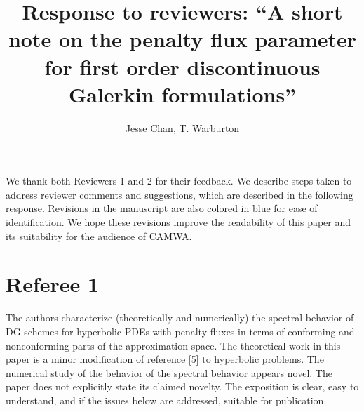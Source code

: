 \documentclass[10pt]{article}
\date{}
\author{Jesse Chan, T. Warburton}
\title{Response to reviewers: ``A short note on the penalty flux parameter for first order discontinuous Galerkin formulations''}
\newcommand{\note}[1]{{\color{blue}#1}}
\begin{document}
\maketitle

\note{We thank both Reviewers 1 and 2 for their feedback.  We describe steps taken to address reviewer comments and suggestions, which are described in the following response.  Revisions in the manuscript are also colored in blue for ease of identification.  We hope these revisions improve the readability of this paper and its suitability for the audience of CAMWA.}

\section{Referee 1}

The authors characterize (theoretically and numerically) the spectral behavior of DG schemes for hyperbolic PDEs with penalty fluxes in terms of conforming and nonconforming parts of the approximation space.  The theoretical work in this paper is a minor modification of reference [5] to hyperbolic problems. The numerical study of the behavior of the spectral behavior appears novel. The paper does not explicitly state its claimed novelty.  The exposition is clear, easy to understand, and if the issues below are addressed, suitable for publication.
\end{document}
